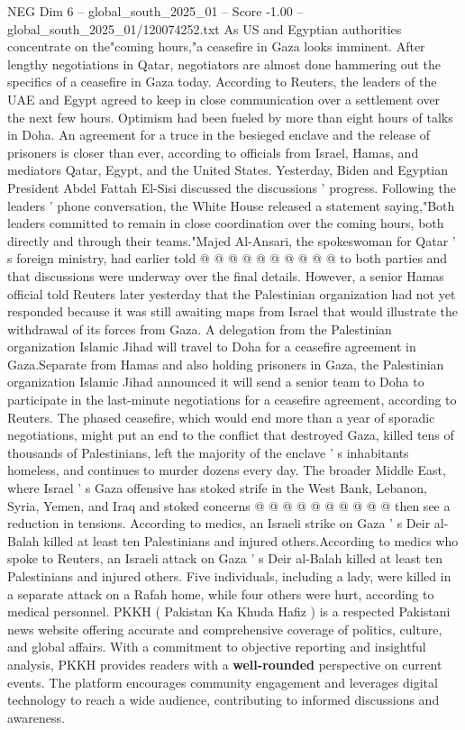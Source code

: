 \begin{textsample}{NEG Dim 6 – global\_south\_2025\_01 – Score -1.00 – global\_south\_2025\_01/120074252.txt}  \label{ex:f6_neg_094}
As US and Egyptian authorities concentrate on the"coming hours,"a ceasefire in Gaza looks imminent.
After lengthy negotiations in Qatar, negotiators are almost done hammering out the specifics of a ceasefire in Gaza today.
According to Reuters, the leaders of the UAE and Egypt agreed to keep in close communication over a settlement over the next few hours.
Optimism had been fueled by more than eight hours of talks in Doha.
An agreement for a truce in the besieged enclave and the release of prisoners is closer than ever, according to officials from Israel, Hamas, and mediators Qatar, Egypt, and the United States.
Yesterday, Biden and Egyptian President Abdel Fattah El-Sisi discussed the discussions ' progress.
Following the leaders ' phone conversation, the White House released a statement saying,"Both leaders committed to remain in close coordination over the coming hours, both directly and through their teams."Majed Al-Ansari, the spokeswoman for Qatar ' s foreign ministry, had earlier told @ @ @ @ @ @ @ @ @ @ to both parties and that discussions were underway over the final details.
However, a senior Hamas official told Reuters later yesterday that the Palestinian organization had not yet responded because it was still awaiting maps from Israel that would illustrate the withdrawal of its forces from Gaza.
A delegation from the Palestinian organization Islamic Jihad will travel to Doha for a ceasefire agreement in Gaza.Separate from Hamas and also holding prisoners in Gaza, the Palestinian organization Islamic Jihad announced it will send a senior team to Doha to participate in the last-minute negotiations for a ceasefire agreement, according to Reuters.
The phased ceasefire, which would end more than a year of sporadic negotiations, might put an end to the conflict that destroyed Gaza, killed tens of thousands of Palestinians, left the majority of the enclave ' s inhabitants homeless, and continues to murder dozens every day.
The broader Middle East, where Israel ' s Gaza offensive has stoked strife in the West Bank, Lebanon, Syria, Yemen, and Iraq and stoked concerns @ @ @ @ @ @ @ @ @ @ then see a reduction in tensions.
According to medics, an Israeli strike on Gaza ' s Deir al-Balah killed at least ten Palestinians and injured others.According to medics who spoke to Reuters, an Israeli attack on Gaza ' s Deir al-Balah killed at least ten Palestinians and injured others.
Five individuals, including a lady, were killed in a separate attack on a Rafah home, while four others were hurt, according to medical personnel.
PKKH ( Pakistan Ka Khuda Hafiz ) is a respected Pakistani news website offering accurate and comprehensive coverage of politics, culture, and global affairs.
With a commitment to objective reporting and insightful analysis, PKKH provides readers with a \textbf{well-rounded} perspective on current events.
The platform encourages community engagement and leverages digital technology to reach a wide audience, contributing to informed discussions and awareness.

\end{textsample}

